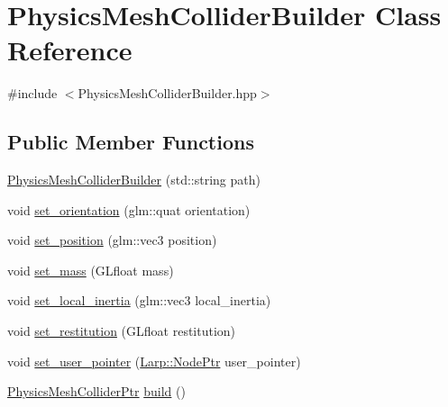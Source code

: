 \hypertarget{classPhysicsMeshColliderBuilder}{}\section{Physics\+Mesh\+Collider\+Builder Class Reference}
\label{classPhysicsMeshColliderBuilder}


{\ttfamily \#include $<$Physics\+Mesh\+Collider\+Builder.\+hpp$>$}

\subsection*{Public Member Functions}
\begin{DoxyCompactItemize}
\item 
\hyperlink{classPhysicsMeshColliderBuilder_a952bf520c1027f8e0eb5578a5cd25b89}{Physics\+Mesh\+Collider\+Builder} (std\+::string path)
\item 
void \hyperlink{classPhysicsMeshColliderBuilder_a7d0c5bfaf8e0bca011ee311ed4c36fc9}{set\+\_\+orientation} (glm\+::quat orientation)
\item 
void \hyperlink{classPhysicsMeshColliderBuilder_aaf6db772b22a11411492b3f43fc95f88}{set\+\_\+position} (glm\+::vec3 position)
\item 
void \hyperlink{classPhysicsMeshColliderBuilder_a011838ad8805502d286182e8017fe3a7}{set\+\_\+mass} (G\+Lfloat mass)
\item 
void \hyperlink{classPhysicsMeshColliderBuilder_a37138f70dbc02843fa06a661f8624439}{set\+\_\+local\+\_\+inertia} (glm\+::vec3 local\+\_\+inertia)
\item 
void \hyperlink{classPhysicsMeshColliderBuilder_a8262d206da5afc9aa1f60471a0c37f1c}{set\+\_\+restitution} (G\+Lfloat restitution)
\item 
void \hyperlink{classPhysicsMeshColliderBuilder_a1c85c9d22611d1b78ef867e04b3bcc07}{set\+\_\+user\+\_\+pointer} (\hyperlink{namespaceLarp_a171c1dc8b70cfb441b15d7386780db23}{Larp\+::\+Node\+Ptr} user\+\_\+pointer)
\item 
\hyperlink{PhysicsMeshCollider_8hpp_a16ccb056e995aced46eb1a10fbfaee87}{Physics\+Mesh\+Collider\+Ptr} \hyperlink{classPhysicsMeshColliderBuilder_a3136483052f4740f1bb544b212f78cc2}{build} ()
\end{DoxyCompactItemize}
